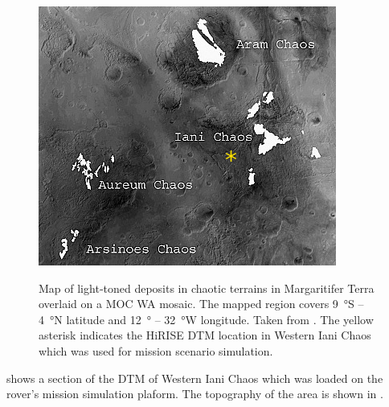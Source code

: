 \begin{figure}[h]
  \centering
  \hypersetup{linkcolor=captionTextColor}
  \includegraphics[width=0.45\linewidth]{sections/mars-solar-energy/mission-sites/images/iani-chaos-deposits.png}\\
  \caption[Map of light‐toned deposits in chaotic terrains in Margaritifer Terra]
          {Map of light‐toned deposits in chaotic terrains in Margaritifer Terra overlaid on a \ac{MOC} \ac{WA} mosaic. The mapped region covers \SI{9}{\degree}S – \SI{4}{\degree}N latitude and \SI{12}{\degree} – \SI{32}{\degree}W longitude. Taken from . The yellow asterisk indicates the \ac{HiRISE} \ac{DTM} location in Western Iani Chaos which was used for mission scenario simulation.}
  \label{fig:mission-site-iani-chaos}
\end{figure}

 shows a section of the \ac{DTM} of Western Iani Chaos which was loaded on the rover's mission simulation plaform. The topography of the area is shown in .

\vspace{0.5cm}

